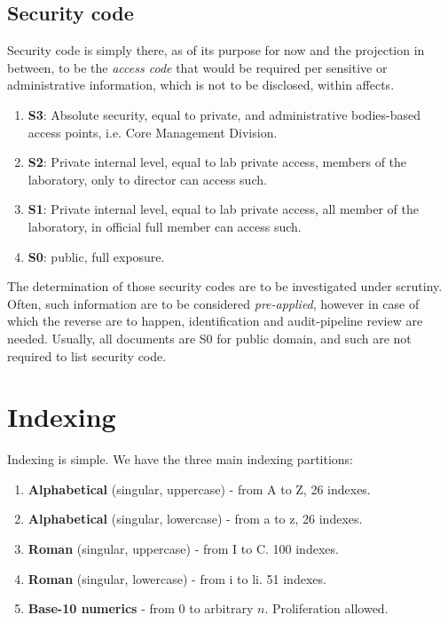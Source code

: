 \documentclass[9pt,a4paper]{article}
\begin{document}
\subsection{Security code}

Security code is simply there, as of its purpose for now and the projection in between, to be the \textit{access code} that would be required per sensitive or administrative information, which is not to be disclosed, within affects. 

\begin{enumerate}
    \item \textbf{S3}: Absolute security, equal to private, and administrative bodies-based access points, i.e. Core Management Division. 
    \item \textbf{S2}: Private internal level, equal to lab private access, members of the laboratory, only to director can access such. 
    \item \textbf{S1}: Private internal level, equal to lab private access, all member of the laboratory, in official full member can access such. 
    \item \textbf{S0}: public, full exposure. 
\end{enumerate}

The determination of those security codes are to be investigated under scrutiny. Often, such information are to be considered \textit{pre-applied}, however in case of which the reverse are to happen, identification and audit-pipeline review are needed. Usually, all documents are S0 for public domain, and such are not required to list security code. 

\section{Indexing}

Indexing is simple. We have the three main indexing partitions:
\begin{enumerate}
    \item \textbf{Alphabetical} (singular, uppercase) - from A to Z, 26 indexes. 
    \item \textbf{Alphabetical} (singular, lowercase) - from a to z, 26 indexes.
    \item \textbf{Roman} (singular, uppercase) - from I to C. 100 indexes. 
    \item \textbf{Roman} (singular, lowercase) - from i to li. 51 indexes. 
    \item \textbf{Base-10 numerics} - from 0 to arbitrary $n$. Proliferation allowed. 
\end{enumerate}
\end{document}
